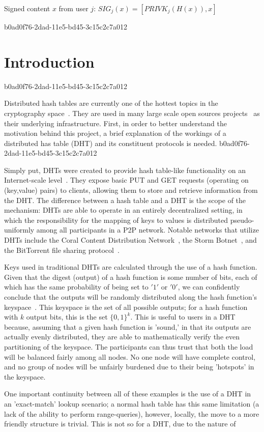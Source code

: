 \documentclass[12pt]{article}
\begin{document}
Signed content $x$ from user $j$: $SIG_j(x) = \left[ PRIVK_j( H(x) ), x \right]$

b0ad0f76-2dad-11e5-bd45-3c15c2c7a012\section{Introduction}
b0ad0f76-2dad-11e5-bd45-3c15c2c7a012\par Distributed hash tables are currently one of the hottest topics in the cryptography space~\cite{Stoica:2001dj,Rowstron:2001ea,Ratnasamy:2001wn}. They are used in many large scale open sources projects~\cite{Freitas:2013tb,Xu:2010vs,Perfitt:2010fh} as their underlying infrastructure. First, in order to better understand the motivation behind this project, a brief explanation of the workings of a distributed has table (DHT) and its constituent protocols is needed.
b0ad0f76-2dad-11e5-bd45-3c15c2c7a012
\par Simply put, DHTs were created to provide hash table-like functionality on an Internet-scale level~\cite{Ratnasamy:2001wn}. They expose basic PUT and GET requests (operating on (key,value) pairs) to clients, allowing them to store and retrieve information from the DHT. The difference between a hash table and a DHT is the scope of the mechanism: DHTs are able to operate in an entirely decentralized setting, in which the responsibility for the mapping of keys to values is distributed pseudo-uniformly among all participants in a P2P network. Notable networks that utilize DHTs include the Coral Content Distribution Network~\cite{Freedman:2004vb}, the Storm Botnet~\cite{Holz:2008uk}, and the BitTorrent file sharing protocol~\cite{Cohen:y1_8mBnw}.

\par Keys used in traditional DHTs are calculated through the use of a hash function. Given that the digest (output) of a hash function is some number of bits, each of which has the same probability of being set to $'1'$ or $'0'$, we can confidently conclude that the outputs will be randomly distributed along the hash function's keyspace~. This keyspace is the set of all possible outputs; for a hash function with $k$ output bits, this is the set $\{0,1\}^k$. This is useful to users in a DHT because, assuming that a given hash function is 'sound,' in that its outputs are actually evenly distributed, they are able to mathematically verify the even partitioning of the keyspace. The participants can thus trust that both the load will be balanced fairly among all nodes. No one node will have complete control, and no group of nodes will be unfairly burdened due to their being 'hotspots' in the keyspace.~

\par One important continuity between all of these examples is the use of a DHT in an 'exact-match' lookup scenario; a normal hash table has this same limitation (a lack of the ability to perform range-queries), however, locally, the move to a more friendly structure is trivial. This is not so for a DHT, due to the nature of
\printbibliography
\end{document}
